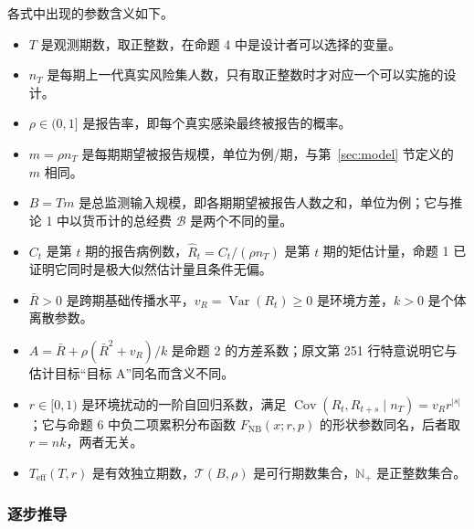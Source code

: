 各式中出现的参数含义如下。
\begin{itemize}
\item $T$ 是观测期数，取正整数，在命题 4 中是设计者可以选择的变量。
\item $n_T$ 是每期上一代真实风险集人数，只有取正整数时才对应一个可以实施的设计。
\item $\rho\in(0,1]$ 是报告率，即每个真实感染最终被报告的概率。
\item $m=\rho n_T$ 是每期期望被报告规模，单位为例/期，与第~\ref{sec:model} 节定义的 $m$ 相同。
\item $B=Tm$ 是总监测输入规模，即各期期望被报告人数之和，单位为例；它与推论 1 中以货币计的总经费 $\mathcal B$ 是两个不同的量。
\item $C_t$ 是第 $t$ 期的报告病例数，$\widehat R_t=C_t/(\rho n_T)$ 是第 $t$ 期的矩估计量，命题 1 已证明它同时是极大似然估计量且条件无偏。
\item $\bar R>0$ 是跨期基础传播水平，$v_R=\operatorname{Var}(R_t)\ge 0$ 是环境方差，$k>0$ 是个体离散参数。
\item $A=\bar R+\rho(\bar R^2+v_R)/k$ 是命题 2 的方差系数；原文第 251 行特意说明它与估计目标“目标 A”同名而含义不同。
\item $r\in[0,1)$ 是环境扰动的一阶自回归系数，满足 $\operatorname{Cov}(R_t,R_{t+s}\mid n_T)=v_Rr^{|s|}$；它与命题 6 中负二项累积分布函数 $F_{\operatorname{NB}}(x;r,p)$ 的形状参数同名，后者取 $r=nk$，两者无关。
\item $T_{\operatorname{eff}}(T,r)$ 是有效独立期数，$\mathcal T(B,\rho)$ 是可行期数集合，$\mathbb N_+$ 是正整数集合。
\end{itemize}

\subsubsection{逐步推导}


